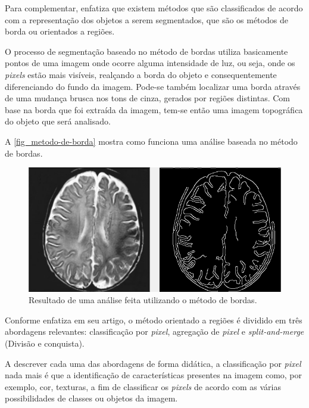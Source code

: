 Para complementar,  enfatiza que existem métodos que são classificados de acordo com a representação dos objetos a serem segmentados, que são os métodos de borda ou orientados a regiões.

O processo de segmentação baseado no método de bordas utiliza basicamente pontos de uma imagem onde ocorre alguma intensidade de luz, ou seja, onde os \textit{pixels} estão mais visíveis, realçando a borda do objeto e consequentemente diferenciando do fundo da imagem. Pode-se também localizar uma borda através de uma mudança brusca nos tons de cinza, gerados por regiões distintas. Com base na borda que foi extraída da imagem, tem-se então uma imagem topográfica do objeto que será analisado.

A \autoref{fig_metodo-de-borda} mostra como funciona uma análise baseada no método de bordas.

\begin{figure}[h]
	\caption{\label{fig_metodo-de-borda}Resultado de uma análise feita utilizando o método de bordas.}
	\begin{center}
		\includegraphics[scale=0.4]{4-Conteudo-Bibliografico/2-Visao-Computacional/Imagens-Visao-Computacional/metodo-de-borda.png}
	\end{center}
	\centering {}
\end{figure}

Conforme  enfatiza em seu artigo, o método orientado a regiões é dividido em três abordagens relevantes: classificação por \textit{pixel}, agregação de \textit{pixel} e \textit{split-and-merge} (Divisão e conquista).

A descrever cada uma das abordagens de forma didática, a classificação por \textit{pixel} nada mais é que a identificação de características presentes na imagem como, por exemplo, cor, texturas, a fim de classificar os \textit{pixels} de acordo com as várias possibilidades de classes ou objetos da imagem.

